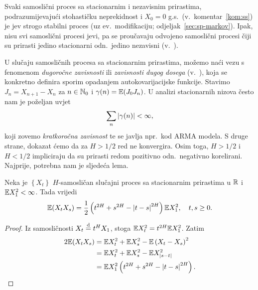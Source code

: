 \documentclass[main.tex]{subfiles}
\begin{document}
Svaki samoslični proces sa stacionarnim i nezavisnim prirastima, podrazumijevajući stohastičku neprekidnost i \( X_0=0 \) g.s.\ (v.\ komentar~\ref{kom:ss}) je
\levy jev strogo stabilni proces (uz ev.\ modifikaciju; odjeljak~\ref{sec:sp-markov}).
Ipak, nisu svi samoslični procesi \levy jevi, pa se proučavaju odvojeno samoslični procesi čiji su prirasti
jedino stacionarni odn.\ jedino nezavisni (v.~\cite{em}).

U slučaju samosličnih procesa sa stacionarnim prirastima, možemo naći vezu s fenomenom
\emph{dugoročne zavisnosti} ili \emph{zavisnosti dugog dosega} (v.~\cite[]{em}), koja se konkretno
definira sporim opadanjem autokovarijacijske funkcije. Stavimo \( J_n = X_{n+1}-X_n \) za \( n \in \mathbb{N}_0 \)
i \( \gamma(n) = \mathbb{E}(J_0J_n) \). U analizi stacionarnih nizova često nam je poželjan uvjet
\[
	\sum_n \left| {\gamma(n)} \right| < \infty,
\]
koji zovemo \emph{kratkoročna zavisnost} te se javlja npr.\ kod ARMA modela. S druge strane, dokazat ćemo da
za \( H > 1/2 \) red ne konvergira. Osim toga, \( H>1/2 \) i \( H<1/2 \) impliciraju da su
prirasti redom pozitivno odn.\ negativno korelirani.
Najprije, potrebna nam je sljedeća lema.

\begin{lema}\label{lema:sssi}
	Neka je \( \left\{ X_t \right\} \) \( H \)-samosličan slučajni proces sa stacionarnim prirastima
	u \( \mathbb{R} \) i \( \mathbb{E} X_1^2 < \infty \). Tada vrijedi
	\begin{equation}
		\mathbb{E}(X_tX_s) = \frac 12 \left( t^{2H}+s^{2H}-\left| {t-s} \right|^{2H} \right) \mathbb{E} X_1^2
		, \quad t,s \ge 0.
	\end{equation}
\end{lema}

\begin{proof}
	Iz samosličnosti \( X_t \stackrel{\mathrm d}{=} t^HX_1 \), stoga \( \mathbb{E} X_t^2 = t^{2H}\mathbb{E} X_1^2 \). Zatim
	\begin{align}
		2 \E(X_tX_s) & =  \E X_t^2 + \E X_s^2 - \E\left( X_t-X_s \right)^2          \\
		             & =  \E X_t^2 + \E X_s^2 - \E X_{\abs{s-t}} ^2                 \\
		             & =  \E X_1^2 \left( t^{2H} + s^{2H} - \abs{t-s}^{2H} \right). %
	\end{align}
\end{proof}
\end{document}
